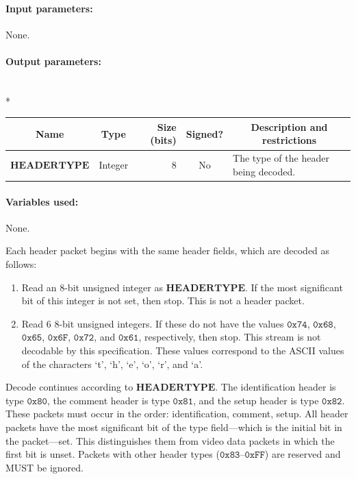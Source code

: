 \documentclass[11pt,letterpaper]{book}
\newcommand{\bitvar}[1]{\ensuremath{\mathbf{\bm #1}}}
\newcommand{\hex}[1]{\ensuremath{\mathtt{0x#1}}}
\numberwithin{equation}{chapter}
\numberwithin{figure}{chapter}
\numberwithin{table}{chapter}
\begin{document}
\paragraph{Input parameters:} None.

\paragraph{Output parameters:}\hfill\\*
\begin{tabularx}{\textwidth}{@{}llrcX@{}}\toprule
\multicolumn{1}{c}{Name} &
\multicolumn{1}{c}{Type} &
\multicolumn{1}{p{30pt}}{\centering Size (bits)} &
\multicolumn{1}{c}{Signed?} &
\multicolumn{1}{c}{Description and restrictions} \\\midrule\endhead
\bitvar{HEADERTYPE} & Integer & 8 & No & The type of the header being
 decoded. \\
\bottomrule\end{tabularx}

\paragraph{Variables used:} None.
\medskip

Each header packet begins with the same header fields, which are decoded as
 follows:

\begin{enumerate}
\item
Read an 8-bit unsigned integer as \bitvar{HEADERTYPE}.
If the most significant bit of this integer is not set, then stop.
This is not a header packet.
\item
Read 6 8-bit unsigned integers.
If these do not have the values \hex{74}, \hex{68}, \hex{65}, \hex{6F},
 \hex{72}, and \hex{61}, respectively, then stop.
This stream is not decodable by this specification.
These values correspond to the ASCII values of the characters `t', `h', `e',
 `o', `r', and `a'.
\end{enumerate}

Decode continues according to \bitvar{HEADERTYPE}.
The identification header is type \hex{80}, the comment header is type
 \hex{81}, and the setup header is type \hex{82}.
These packets must occur in the order: identification, comment, setup.
All header packets have the most significant bit of the type
 field---which is the initial bit in the packet---set.
This distinguishes them from video data packets in which the first bit
 is unset.
Packets with other header types (\hex{83}--\hex{FF}) are reserved and MUST be
 ignored.
\end{document}
